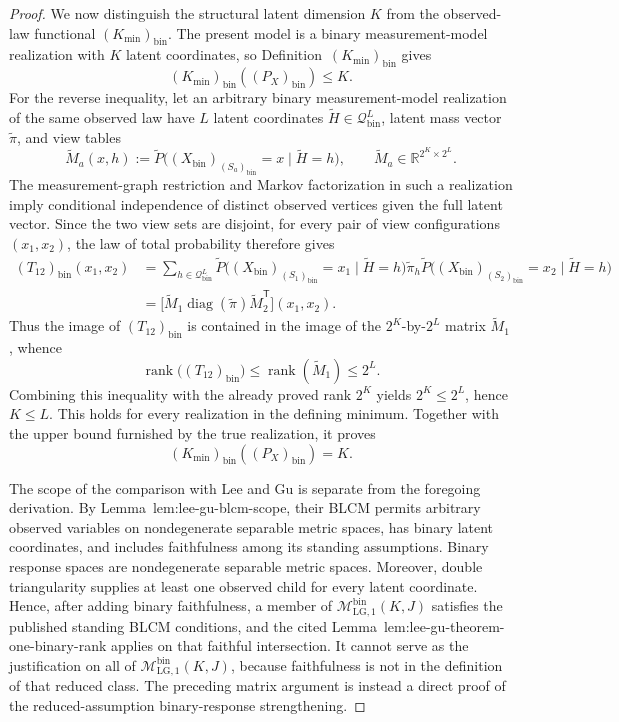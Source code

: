 \documentclass{article}
\begin{document}
\begin{proof}
We now distinguish the structural latent dimension \(K\) from the
observed-law functional \((K_{\min})_{\mathrm{bin}}\).  The present model is
a binary measurement-model realization with \(K\) latent coordinates, so
Definition~\textnormal{\((K_{\min})_{\mathrm{bin}}\)} gives
\[
 (K_{\min})_{\mathrm{bin}}((P_X)_{\mathrm{bin}})\leq K.
\]
For the reverse inequality, let an arbitrary binary measurement-model
realization of the same observed law have \(L\) latent coordinates
\(\widetilde H\in\mathcal Q_{\mathrm{bin}}^L\), latent mass vector
\(\widetilde\pi\), and view tables
\[
 \widetilde M_a(x,h)
 :=\widetilde P\bigl((X_{\mathrm{bin}})_{(S_a)_{\mathrm{bin}}}=x
          \mid \widetilde H=h\bigr),
 \qquad
 \widetilde M_a\in\mathbb R^{2^K\times 2^L}.
\]
The measurement-graph restriction and Markov factorization in such a
realization imply conditional independence of distinct observed vertices
given the full latent vector.  Since the two view sets are disjoint, for
every pair of view configurations \((x_1,x_2)\), the law of total probability
therefore gives
\[
 \begin{aligned}
 (T_{12})_{\mathrm{bin}}(x_1,x_2)
 &=\sum_{h\in\mathcal Q_{\mathrm{bin}}^L}
   \widetilde P\bigl((X_{\mathrm{bin}})_{(S_1)_{\mathrm{bin}}}=x_1
                   \mid\widetilde H=h\bigr)
   \widetilde\pi_h
   \widetilde P\bigl((X_{\mathrm{bin}})_{(S_2)_{\mathrm{bin}}}=x_2
                   \mid\widetilde H=h\bigr) \\
 &=\bigl[\widetilde M_1\operatorname{diag}(\widetilde\pi)
          \widetilde M_2^{\mathsf T}\bigr](x_1,x_2).
 \end{aligned}
\]
Thus the image of \((T_{12})_{\mathrm{bin}}\) is contained in the image of
the \(2^K\)-by-\(2^L\) matrix \(\widetilde M_1\), whence
\[
 \operatorname{rank}\bigl((T_{12})_{\mathrm{bin}}\bigr)
 \leq\operatorname{rank}(\widetilde M_1)\leq 2^L.
\]
Combining this inequality with the already proved rank \(2^K\) yields
\(2^K\leq2^L\), hence \(K\leq L\).  This holds for every realization in
the defining minimum.  Together with the upper bound furnished by the true
realization, it proves
\[
 (K_{\min})_{\mathrm{bin}}((P_X)_{\mathrm{bin}})=K.
\]

The scope of the comparison with Lee and Gu is separate from the foregoing
derivation.  By Lemma~\textnormal{lem:lee-gu-blcm-scope}, their BLCM permits
arbitrary observed variables on nondegenerate separable metric spaces, has
binary latent coordinates, and includes faithfulness among its standing
assumptions.  Binary response spaces are nondegenerate separable metric
spaces.  Moreover, double triangularity supplies at least one observed child
for every latent coordinate.  Hence, after adding binary faithfulness, a
member of \(\mathcal M_{\mathrm{LG},1}^{\mathrm{bin}}(K,J)\) satisfies the
published standing BLCM conditions, and the cited
Lemma~\textnormal{lem:lee-gu-theorem-one-binary-rank} applies on that faithful
intersection.  It cannot serve as the justification on all of
\(\mathcal M_{\mathrm{LG},1}^{\mathrm{bin}}(K,J)\), because faithfulness is
not in the definition of that reduced class.  The preceding matrix argument
is instead a direct proof of the reduced-assumption binary-response
strengthening.


\end{proof}
\end{document}

